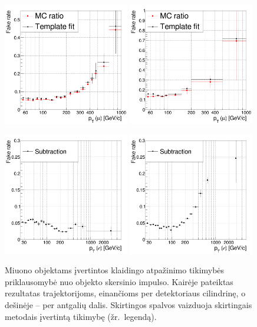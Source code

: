 \documentclass[a4paper, 12pt, oneside]{article}
\begin{document}
\begin{figure}[t!]
	\RawFloats
	\includegraphics[width=0.49\textwidth]{Magistrinis/FRmu_barrel.png}
	\includegraphics[width=0.49\textwidth]{Magistrinis/FRmu_endcap.png}
	\caption{\label{fig:FRmu}
		Miuono objektams įvertintos klaidingo atpažinimo tikimybės priklausomybė nuo objekto skersinio impulso.
		Kairėje pateiktas rezultatas trajektorijoms, einančioms per detektoriaus cilindrinę, o dešinėje -- per antgalių dalis.
		Skirtingos spalvos vaizduoja skirtingais metodais įvertintą tikimybę (žr.\ legendą).}
	\vspace{3cm}
	\includegraphics[width=0.49\textwidth]{Magistrinis/FRe_barrel.png}
	\includegraphics[width=0.49\textwidth]{Magistrinis/FRe_endcap.png}

\end{figure}
\end{document}
